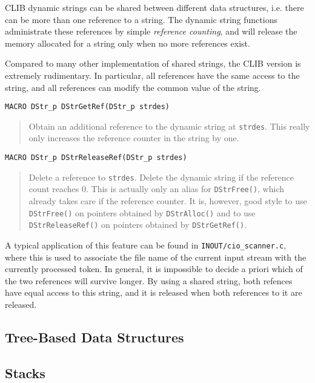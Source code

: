 CLIB dynamic strings can be shared between different data structures,
i.e. there can be more than one reference to a string. The dynamic
string functions administrate these references by simple
\emph{reference counting}, and will release the memory allocated for a
string only when no more references exist. 

Compared to many other implementation of shared strings, the CLIB
version is extremely rudimentary. In particular, all references have
the same access to the string, and all references can modify the
common value of the string.

\begin{verbatim}
MACRO DStr_p DStrGetRef(DStr_p strdes)
\end{verbatim}
\begin{quote}
  Obtain an additional reference to the dynamic string at
  \texttt{strdes}. This really only increases the reference counter in
  the string by one.
\end{quote}


\begin{verbatim}
MACRO DStr_p DStrReleaseRef(DStr_p strdes)
\end{verbatim}
\begin{quote}
  Delete a reference to \texttt{strdes}. Delete the dynamic string if
  the reference count reaches 0. This is actually only an alias for
  \texttt{DStrFree()}, which already takes care if the reference
  counter. It is, however, good style to use \texttt{DStrFree()} on
  pointers obtained by \texttt{DStrAlloc()} and to use
  \texttt{DStrReleaseRef()} on pointers obtained by
  \texttt{DStrGetRef()}.
\end{quote}


A typical application of this feature can be found in
\texttt{INOUT/cio\_scanner.c}, where this is used to associate the
file name of the current input stream with the currently processed
token. In general, it is impossible to decide a priori which of the
two references will survive longer. By using a shared string, both
refences have equal access to this string, and it is released when
both references to it are released.

\subsection{Tree-Based Data Structures}
\label{sec:basics:trees}


\subsection{Stacks}
\label{sec:basics:stacks}





